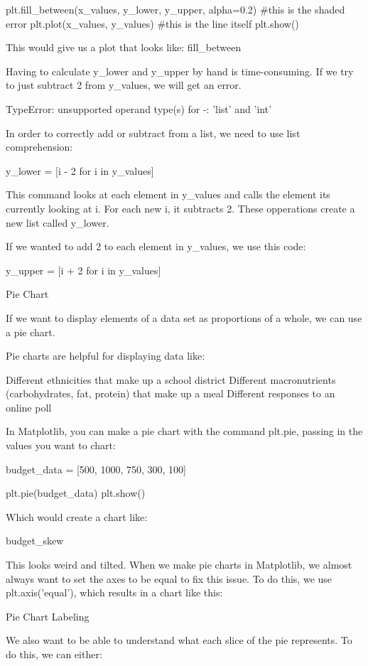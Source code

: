 \documentclass{journal}
\begin{document}
plt.fill_between(x_values, y_lower, y_upper, alpha=0.2) #this is the shaded error
plt.plot(x_values, y_values) #this is the line itself
plt.show()

This would give us a plot that looks like: fill_between

Having to calculate y_lower and y_upper by hand is time-consuming. If we try to just subtract 2 from y_values, we will get an error.

TypeError: unsupported operand type(s) for -: 'list' and 'int'

In order to correctly add or subtract from a list, we need to use list comprehension:

y_lower = [i - 2 for i in y_values]

This command looks at each element in y_values and calls the element its currently looking at i. For each new i, it subtracts 2. These opperations create a new list called y_lower.

If we wanted to add 2 to each element in y_values, we use this code:

y_upper = [i + 2 for i in y_values]

Pie Chart

If we want to display elements of a data set as proportions of a whole, we can use a pie chart.

Pie charts are helpful for displaying data like:

    Different ethnicities that make up a school district
    Different macronutrients (carbohydrates, fat, protein) that make up a meal
    Different responses to an online poll

In Matplotlib, you can make a pie chart with the command plt.pie, passing in the values you want to chart:

budget_data = [500, 1000, 750, 300, 100]

plt.pie(budget_data)
plt.show()

Which would create a chart like:

budget_skew

This looks weird and tilted. When we make pie charts in Matplotlib, we almost always want to set the axes to be equal to fix this issue. To do this, we use plt.axis('equal'), which results in a chart like this:





Pie Chart Labeling

We also want to be able to understand what each slice of the pie represents. To do this, we can either:
\end{document}
